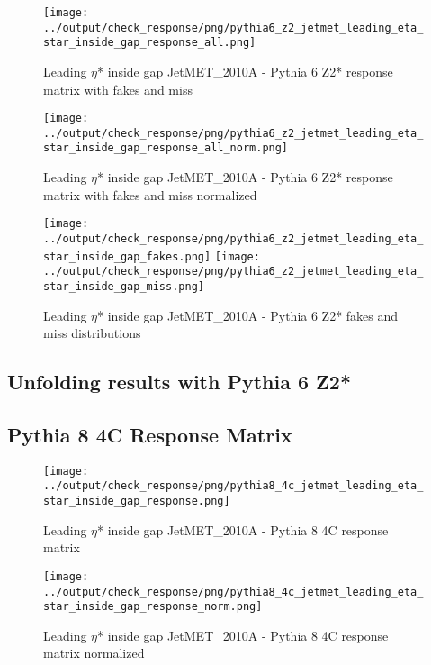 \documentclass[11pt]{book}
\begin{document}
\begin{figure}[ht]
\centering
\texttt{[image: ../output/check\_response/png/pythia6\_z2\_jetmet\_leading\_eta\_star\_inside\_gap\_response\_all.png]}
\caption{Leading $\eta$* inside gap JetMET\_2010A - Pythia 6 Z2* response matrix with fakes and miss}
\label{p6_jetmet_leading_eta_star_inside_gap_response_all}
\end{figure}

\begin{figure}[ht]
\centering
\texttt{[image: ../output/check\_response/png/pythia6\_z2\_jetmet\_leading\_eta\_star\_inside\_gap\_response\_all\_norm.png]}
\caption{Leading $\eta$* inside gap JetMET\_2010A - Pythia 6 Z2* response matrix with fakes and miss normalized}
\label{p6_jetmet_leading_eta_star_inside_gap_response_all_norm}
\end{figure}

\begin{figure}[ht]
\centering
\texttt{[image: ../output/check\_response/png/pythia6\_z2\_jetmet\_leading\_eta\_star\_inside\_gap\_fakes.png]}
\texttt{[image: ../output/check\_response/png/pythia6\_z2\_jetmet\_leading\_eta\_star\_inside\_gap\_miss.png]}
\caption{Leading $\eta$* inside gap JetMET\_2010A - Pythia 6 Z2* fakes and miss distributions}
\label{p6_jetmet_leading_eta_star_inside_gap_fakesmiss}
\end{figure}


\clearpage
\subsection{Unfolding results with Pythia 6 Z2*}


\clearpage
\subsection{Pythia 8 4C Response Matrix}


\begin{figure}[ht]
\centering
\texttt{[image: ../output/check\_response/png/pythia8\_4c\_jetmet\_leading\_eta\_star\_inside\_gap\_response.png]}
\caption{Leading $\eta$* inside gap JetMET\_2010A - Pythia 8 4C response matrix}
\label{p8_jetmet_leading_eta_star_inside_gap_response}
\end{figure}

\begin{figure}[ht]
\centering
\texttt{[image: ../output/check\_response/png/pythia8\_4c\_jetmet\_leading\_eta\_star\_inside\_gap\_response\_norm.png]}
\caption{Leading $\eta$* inside gap JetMET\_2010A - Pythia 8 4C response matrix normalized}
\label{p8_jetmet_leading_eta_star_inside_gap_response_norm}
\end{figure}
\end{document}
